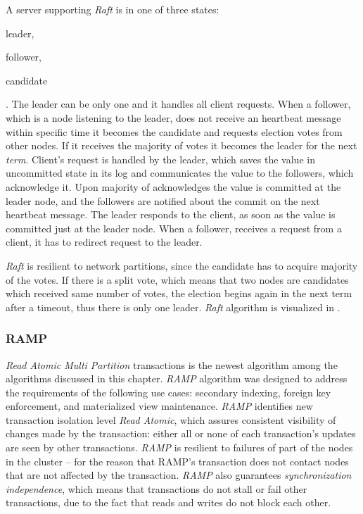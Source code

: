  A server supporting \emph{Raft} is in one of three states: \begin{enumerate*} \item leader, \item follower, \item candidate \end{enumerate*}. The leader can be only one and it handles all client requests.
  When a follower, which is a node listening to the leader, does not receive an heartbeat message within specific time it becomes the candidate and requests election votes from other nodes. If it receives the majority of votes it becomes the leader for the next \emph{term}. Client's request is handled by the leader, which saves the value in uncommitted state in its log and communicates the value to the followers, which acknowledge it. Upon majority of acknowledges the value is committed at the leader node, and the followers are notified about the commit on the next heartbeat message. The leader responds to the client, as soon as the value is committed just at the leader node. When a follower, receives a request from a client, it has to redirect request to the leader.

  \emph{Raft} is resilient to network partitions, since the candidate has to acquire majority of the votes. If there is a split vote, which means that two nodes are candidates which received same number of votes, the election begins again in the next term after a timeout, thus there is only one leader.
  \emph{Raft} algorithm is visualized in \cite{raftVisual}.






\subsubsection{RAMP}\label{sec:theory:transactions:ramp}
\emph{Read Atomic Multi Partition} transactions \cite{Bailis:2014} is the newest algorithm among the algorithms discussed in this chapter. 
\emph{RAMP} algorithm was designed to address the requirements of the following use cases: secondary indexing, foreign key
enforcement, and materialized view maintenance.
\emph{RAMP} identifies new transaction isolation level \emph{Read Atomic}, which 
assures consistent visibility of changes made by the transaction: either all or none of each transaction's updates are seen by other transactions.
\emph{RAMP} is resilient to failures of part of the nodes in the cluster -- for the reason that RAMP's transaction does not contact nodes that are not affected by the transaction. 
\emph{RAMP} also guarantees \emph{synchronization independence}, which means that transactions do not stall or fail other transactions, due to the fact that reads and writes do not block each other. 

